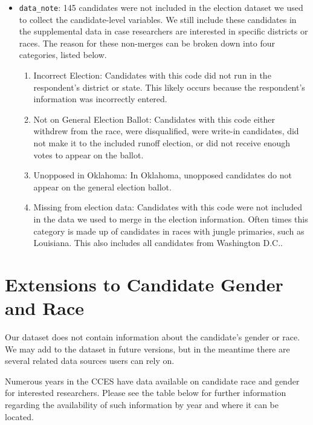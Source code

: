 \documentclass[12pt]{article}
\begin{document}
\begin{itemize}[leftmargin=*]
\item \texttt{data\_note}: 145 candidates were not included in the election dataset we used to collect the candidate-level variables. We still include these candidates in the supplemental data in case researchers are interested in specific districts or races. The reason for these non-merges can be broken down into four categories, listed below.
		\begin{enumerate}
			\item Incorrect Election: Candidates with this code  did not run in the respondent's district or state. This likely occurs because the respondent's information was incorrectly entered. 
			\item Not on General Election Ballot: Candidates with this code either withdrew from the race, were disqualified, were write-in candidates, did not make it to the included runoff election, or did not receive enough votes to appear on the ballot. 
			\item Unopposed in Oklahoma: In Oklahoma, unopposed candidates do not appear on the general election ballot. 
			\item Missing from election data: Candidates with this code were not included in the data we used to merge in the election information. Often times this category is made up of candidates in races with jungle primaries, such as Louisiana. This also includes all candidates from Washington D.C.. 
		\end{enumerate}
\end{itemize}
	




\section{Extensions to Candidate Gender and Race}
	
Our dataset does not contain information about the candidate's gender or race. We may add to the dataset in future versions, but in the meantime there are several related data sources users can rely on.

Numerous years in the CCES have data available on candidate race and gender for interested researchers. Please see the table below for further information regarding the availability of such information by year and where it can be located. 
\end{document}
